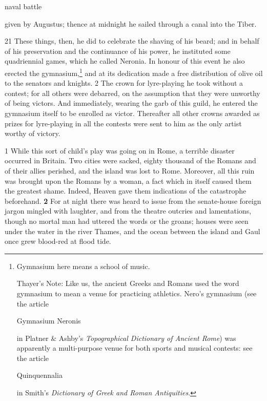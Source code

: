 naval battle

given by Augustus; thence at midnight he sailed through a canal into the Tiber.

21
These things, then, he did to celebrate the shaving of his beard; and in behalf of his preservation and the continuance of his power, he instituted some quadriennial games, which he called Neronia. In honour of this event he also erected the gymnasium,\texthebrew{⁠}\footnote{Gymnasium here means a school of music.

Thayer's Note: Like us, the ancient Greeks and Romans used the word gymnasium to mean a venue for practi­cing athletics. Nero's gymnasium (see the article

Gymnasium Neronis

in Platner \& Ashby's \emph{Topographical Dictionary of Ancient Rome}) was apparently a multi-purpose venue for both sports and musical contests: see the article

Quinquennalia

in Smith's \emph{Dictionary of Greek and Roman Antiquities}.

} and at its dedication made a free distribution of olive oil to the senators and knights. 2 The crown for lyre-playing he took without a contest; for all others were debarred, on the assumption that they were unworthy of being victors. And immediately, wearing the garb of this guild, he entered the gymnasium itself to be enrolled as victor. Thereafter all other crowns awarded as prizes for lyre-playing in all the contests were sent to him as the only artist worthy of victory.


1 While this sort of child's play was going on in Rome, a terrible disaster occurred in Britain. Two cities were sacked, eighty thousand of the Romans and of their allies perished, and the island was lost to Rome. Moreover, all this ruin was brought upon the Romans by a woman, a fact which in itself caused them the greatest shame. Indeed, Heaven gave them indications of the catastrophe beforehand. \textbf{2} For at night there was heard to issue from the senate-house foreign jargon mingled with laughter, and from the theatre outcries and lamentations, though no mortal man had uttered the words or the groans; houses were seen under the water in the river Thames, and the ocean between the island and Gaul once grew blood-red at flood tide.

